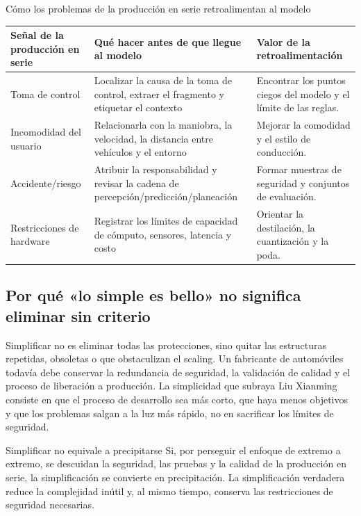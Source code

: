\documentclass[a4paper]{article}
\begin{document}
\begin{knowledgebox}{Cómo los problemas de la producción en serie retroalimentan al modelo}
\begin{tabularx}{\textwidth}{p{}p{}X}
\toprule
Señal de la producción en serie & Qué hacer antes de que llegue al modelo & Valor de la retroalimentación \\
\midrule
Toma de control & Localizar la causa de la toma de control, extraer el fragmento y etiquetar el contexto & Encontrar los puntos ciegos del modelo y el límite de las reglas. \\
Incomodidad del usuario & Relacionarla con la maniobra, la velocidad, la distancia entre vehículos y el entorno & Mejorar la comodidad y el estilo de conducción. \\
Accidente/riesgo & Atribuir la responsabilidad y revisar la cadena de percepción/predicción/planeación & Formar muestras de seguridad y conjuntos de evaluación. \\
Restricciones de hardware & Registrar los límites de capacidad de cómputo, sensores, latencia y costo & Orientar la destilación, la cuantización y la poda. \\
\bottomrule
\end{tabularx}
\end{knowledgebox}

\subsection{Por qué «lo simple es bello» no significa eliminar sin criterio}

Simplificar no es eliminar todas las protecciones, sino quitar las estructuras repetidas, obsoletas o que obstaculizan el scaling. Un fabricante de automóviles todavía debe conservar la redundancia de seguridad, la validación de calidad y el proceso de liberación a producción. La simplicidad que subraya Liu Xianming consiste en que el proceso de desarrollo sea más corto, que haya menos objetivos y que los problemas salgan a la luz más rápido, no en sacrificar los límites de seguridad.

\begin{warningbox}{Simplificar no equivale a precipitarse}
Si, por perseguir el enfoque de extremo a extremo, se descuidan la seguridad, las pruebas y la calidad de la producción en serie, la simplificación se convierte en precipitación. La simplificación verdadera reduce la complejidad inútil y, al mismo tiempo, conserva las restricciones de seguridad necesarias.
\end{warningbox}
\end{document}
